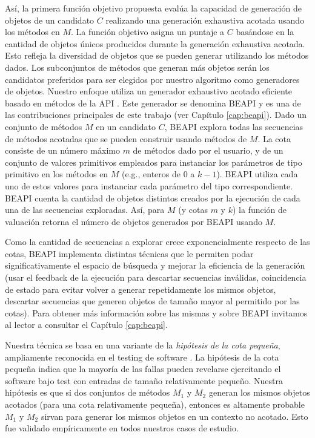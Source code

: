 Así, la primera función objetivo propuesta evalúa la capacidad de generación de objetos de un candidato $C$ realizando una generación exhaustiva acotada \cite{Politano20} usando los métodos en $M$. La función objetivo asigna un puntaje a $C$ basándose en la cantidad de objetos únicos producidos durante la generación exhaustiva acotada. Esto refleja la diversidad de objetos que se pueden generar utilizando los métodos dados. Los subconjuntos de métodos que generan más objetos serán los candidatos preferidos para ser elegidos por nuestro algoritmo como generadores de objetos.
Nuestro enfoque utiliza un generador exhaustivo acotado eficiente basado en métodos de la API \cite{Politano20}. Este generador se denomina BEAPI y es una de las contribuciones principales de este trabajo (ver Capítulo \ref{cap:beapi}).
Dado un conjunto de métodos $M$ en un candidato $C$, BEAPI explora todas las secuencias de métodos acotadas que se pueden construir usando métodos de $M$. La cota consiste de un número máximo $m$ de métodos dado por el usuario, y de un conjunto de valores primitivos empleados para instanciar los parámetros de tipo primitivo en los métodos en $M$ (e.g., enteros de \( 0 \) a \( k-1 \)).
BEAPI utiliza cada uno de estos valores para instanciar cada parámetro del tipo correspondiente. 
BEAPI cuenta la cantidad de objetos distintos creados por la ejecución de cada una de las secuencias exploradas. 
Así, para $M$ (y cotas $m$ y $k$) la función de valuación retorna el número de objetos generados por BEAPI usando $M$.

Como la cantidad de secuencias a explorar crece exponencialmente respecto de las cotas, BEAPI implementa distintas técnicas que le permiten podar significativamente el espacio de búsqueda y mejorar la eficiencia de la generación (usar el feedback de la ejecución para descartar secuencias inválidas, coincidencia de estado para evitar volver a generar repetidamente los mismos objetos, descartar secuencias que generen objetos de tamaño mayor al permitido por las cotas). Para obtener más información sobre las mismas y sobre BEAPI invitamos al lector a consultar el Capítulo \ref{cap:beapi}.

Nuestra técnica se basa en una variante de la \emph{hipótesis de la cota pequeña}, ampliamente reconocida en el testing de software \cite{Andoni:2003,jackson2006, Abad13}. La hipótesis de la cota pequeña indica que la mayoría de las fallas pueden revelarse ejercitando el software bajo test con entradas de tamaño relativamente pequeño. Nuestra hipótesis es que si dos conjuntos de métodos $M_1$ y $M_2$ generan los mismos objetos acotados (para una cota relativamente pequeña), entonces es altamente probable $M_1$ y $M_2$ sirvan para generar los mismos objetos en un contexto no acotado. Esto fue validado empíricamente en todos nuestros casos de estudio.

